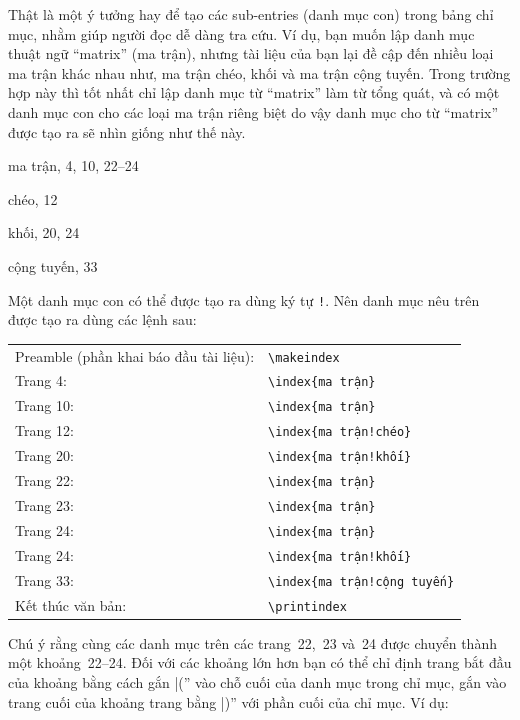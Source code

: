 \documentclass[a4paper]{report}
\begin{document}
Thật là một ý tưởng hay để tạo các sub-entries (danh mục con) trong bảng chỉ mục, nhằm giúp người đọc dễ dàng tra cứu. Ví dụ, bạn muốn lập danh mục thuật ngữ ``matrix'' (ma trận), nhưng tài liệu của bạn lại đề cập đến nhiều loại ma trận khác nhau như, ma trận chéo, khối và ma trận cộng tuyến. Trong trường hợp này thì tốt nhất chỉ lập danh mục từ ``matrix'' làm từ tổng quát, và có một danh mục con cho các loại ma trận riêng biệt do vậy danh mục cho từ ``matrix'' được tạo ra sẽ nhìn giống như thế này.  
\begin{description}
\item ma trận, 4, 10, 22--24
\begin{description}
\item chéo, 12
\item khối, 20, 24
\item cộng tuyến, 33
\end{description}
\end{description}
Một danh mục con có thể được tạo ra dùng ký tự \texttt{!}. 
Nên danh mục nêu trên được tạo ra dùng các lệnh sau: 
\begin{center}
\begin{tabular}{ll}
Preamble (phần khai báo đầu tài liệu): & \verb|\makeindex|\\ 
Trang 4: & \verb|\index{ma trận}|\\
Trang 10: & \verb|\index{ma trận}|\\
Trang 12: & \verb|\index{ma trận!chéo}|\\
Trang 20: & \verb|\index{ma trận!khối}|\\
Trang 22: & \verb|\index{ma trận}|\\
Trang 23: & \verb|\index{ma trận}|\\
Trang 24: & \verb|\index{ma trận}|\\
Trang 24: & \verb|\index{ma trận!khối}|\\
Trang 33: & \verb|\index{ma trận!cộng tuyến}|\\
Kết thúc văn bản: & \verb|\printindex|
\end{tabular}
\end{center}
 Chú ý rằng cùng các danh mục trên các trang~22,~23 và~24 được chuyển thành  một khoảng~22--24.  Đối với các khoảng lớn hơn bạn có thể chỉ định trang bắt đầu của khoảng bằng cách gắn \verb''|(''  vào chỗ cuối của danh mục trong chỉ mục, gắn vào trang cuối của khoảng trang bằng \verb''|)'' với phần cuối của chỉ mục. 
Ví dụ:
\end{document}
